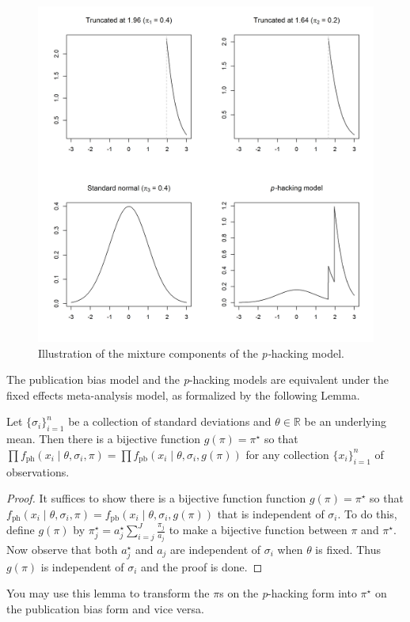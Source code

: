 \begin{figure}
\noindent \begin{centering}
\includegraphics[scale=0.5]{plots/p-hacking}
\par\end{centering}
\caption{\label{fig:p-hacking plots}Illustration of the mixture components
of the \emph{p-}hacking model.}

\end{figure}

The publication bias model and the \emph{p}-hacking models are equivalent
under the fixed effects meta-analysis model, as formalized by the
following Lemma.
\begin{lem}
\label{lem:equivalence}Let $\{\sigma_{i}\}_{i=1}^{n}$ be
a collection of standard deviations and $\theta\in\mathbb{R}$ be
an underlying mean. Then there is a bijective function $g(\pi)=\pi^{\star}$
so that $\prod f_{\textrm{ph}}(x_{i}\mid\theta,\sigma_{i},\pi)=\prod f_{\textrm{pb}}(x_{i}\mid\theta,\sigma_{i},g(\pi))$
for any collection $\{x_{i}\}_{i=1}^{n}$ of observations.
\end{lem}

\begin{proof}
It suffices to show there is a bijective function function $g(\pi)=\pi^{\star}$
so that $f_{\textrm{ph}}(x_{i}\mid\theta,\sigma_{i},\pi)=f_{\textrm{pb}}(x_{i}\mid\theta,\sigma_{i},g(\pi))$
that is independent of $\sigma_{i}$. To do this, define $g(\pi)$
by $\pi_{j}^{\star}=a_{j}^{\star}\sum_{i=j}^{J}\frac{\pi_{j}}{a_{j}}$
to make a bijective function between $\pi$ and $\pi^{\star}$. Now
observe that both $a_{j}^{\star}$ and $a_{j}$ are independent of
$\sigma_{i}$ when $\theta$ is fixed. Thus $g(\pi)$ is independent
of $\sigma_{i}$ and the proof is done.
\end{proof}
You may use this lemma to transform the $\pi$s on the \emph{p}-hacking
form into $\pi^{\star}$ on the publication bias form and vice versa. 